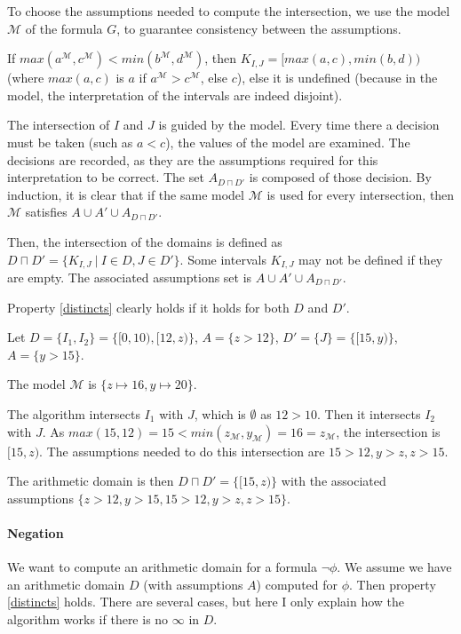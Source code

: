 To choose the assumptions needed to compute the intersection, we use the model
$\mathcal{M}$
of the formula $G$, to guarantee consistency between the assumptions.

If
$max(a^\mathcal{M}, c^\mathcal{M}) < min(b^\mathcal{M}, d^\mathcal{M})$,
then $K_{I, J} = [max(a, c), min(b, d))$ (where $max(a, c)$ is $a$
if $a^\mathcal{M} > c^\mathcal{M}$, else $c$), else it is undefined
(because in the model, the interpretation of the intervals are indeed
disjoint).

The intersection of $I$ and $J$ is guided by the model.
Every time there a decision must be taken (such as $a < c$), the values
of the model are examined. The decisions are recorded, as they
are the assumptions required for this interpretation to be correct. The
set $A_{D\sqcap D'}$ is composed of those decision. By induction, it is clear that if the same model
$\mathcal{M}$ is used for every intersection, then $\mathcal{M}$ satisfies $A \cup A' \cup A_{D \sqcap D'}$.

Then, the intersection of the domains is defined as
$D \sqcap D' = \{ K_{I, J} \ |\ I \in D, J \in D' \}$. Some intervals $K_{I, J}$ may not be defined
if they are empty. The associated assumptions set is $A \cup A' \cup A_{D \sqcap D'}$.

Property \ref{distincts} clearly holds if it holds for both $D$ and $D'$.

\begin{example}

Let $D = \{ I_1, I_2\} =  \{[0, 10), [12, z)\}$, $A = \{ z > 12 \}$, $D' = \{J\}= \{[15, y)\}$, $A =
\{ y > 15 \}$.

The model $\mathcal{M}$ is $\{ z \mapsto 16, y \mapsto 20 \}$.

The algorithm intersects $I_1$ with $J$,  which is $\emptyset$ as $12 > 10$. Then it intersects
$I_2$ with $J$. As $max(15, 12) = 15 < min(z_\mathcal{M}, y_\mathcal{M}) = 16 = z_\mathcal{M}$, the
intersection is $[15, z)$. The assumptions needed to do this intersection are $15 > 12, y > z, z >
15$.

The arithmetic domain is then $D\sqcap D' = \{[15, z)\}$ with the associated assumptions $\{z > 12,
y > 15, 15 > 12, y > z, z > 15\}$.

\end{example}

\paragraph{Negation}
We want to compute an arithmetic domain for a formula $\lnot \phi$. We assume we have an arithmetic
domain $D$ (with assumptions $A$) computed for $\phi$. Then property \ref{distincts} holds. There
are several cases, but here I only explain how the algorithm works if there is no $\infty$ in $D$.

